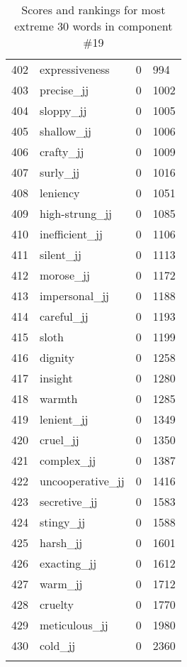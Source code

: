 \begin{longtable}[!htbp]{| rlr@{.}l |}
    402 & expressiveness & 0 & 994 \\
    403 & precise\_jj & 0 & 1002 \\
    404 & sloppy\_jj & 0 & 1005 \\
    405 & shallow\_jj & 0 & 1006 \\
    406 & crafty\_jj & 0 & 1009 \\
    407 & surly\_jj & 0 & 1016 \\
    408 & leniency & 0 & 1051 \\
    409 & high-strung\_jj & 0 & 1085 \\
    410 & inefficient\_jj & 0 & 1106 \\
    411 & silent\_jj & 0 & 1113 \\
    412 & morose\_jj & 0 & 1172 \\
    413 & impersonal\_jj & 0 & 1188 \\
    414 & careful\_jj & 0 & 1193 \\
    415 & sloth & 0 & 1199 \\
    416 & dignity & 0 & 1258 \\
    417 & insight & 0 & 1280 \\
    418 & warmth & 0 & 1285 \\
    419 & lenient\_jj & 0 & 1349 \\
    420 & cruel\_jj & 0 & 1350 \\
    421 & complex\_jj & 0 & 1387 \\
    422 & uncooperative\_jj & 0 & 1416 \\
    423 & secretive\_jj & 0 & 1583 \\
    424 & stingy\_jj & 0 & 1588 \\
    425 & harsh\_jj & 0 & 1601 \\
    426 & exacting\_jj & 0 & 1612 \\
    427 & warm\_jj & 0 & 1712 \\
    428 & cruelty & 0 & 1770 \\
    429 & meticulous\_jj & 0 & 1980 \\
    430 & cold\_jj & 0 & 2360 \\
    \hline
    \caption{Scores and rankings for most extreme 30 words in component \#19} \\
\end{longtable}
